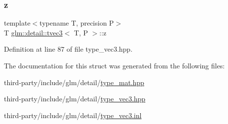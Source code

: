 \mbox{\label{structglm_1_1detail_1_1tvec3_a9996ce4dc16af21710bd1f7102fa66a7}} 
\subsubsection{\texorpdfstring{z}{z}}
{\footnotesize\ttfamily template$<$typename T, precision P$>$ \\
T \hyperlink{structglm_1_1detail_1_1tvec3}{glm\+::detail\+::tvec3}$<$ T, P $>$\+::z}



Definition at line 87 of file type\+\_\+vec3.\+hpp.



The documentation for this struct was generated from the following files\+:\begin{DoxyCompactItemize}
\item 
third-\/party/include/glm/detail/\hyperlink{type__mat_8hpp}{type\+\_\+mat.\+hpp}\item 
third-\/party/include/glm/detail/\hyperlink{type__vec3_8hpp}{type\+\_\+vec3.\+hpp}\item 
third-\/party/include/glm/detail/\hyperlink{type__vec3_8inl}{type\+\_\+vec3.\+inl}\end{DoxyCompactItemize}
